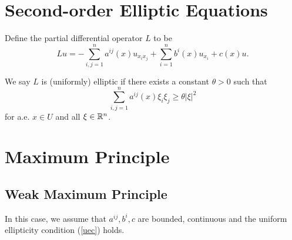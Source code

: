 \section{Second-order Elliptic Equations}
Define the partial differential operator $L$ to be
\begin{equation}
  Lu=-\sum_{i,j=1}^{n}a^{ij}(x)u_{x_ix_j}+\sum_{i=1}^{n} b^{i}(x)u_{x_i}+c(x)u.
\end{equation}
\begin{definition}
  We say $L$ is (uniformly) elliptic if there exists a constant $\theta>0$ such that
  \begin{equation}
    \sum_{i,j=1}^{n}a^{ij}(x)\xi_i\xi_j\ge \theta \left| \xi \right|^2 \label{uec}
  \end{equation}
  for a.e. $x\in U$ and all $\xi \in \mathbb{R}^{n}$.
\end{definition}
\section{Maximum Principle}
\subsection{Weak Maximum Principle}
In this case, we assume that $a^{ij},b^{i},c$ are bounded, continuous and the uniform ellipticity condition (\ref{uec}) holds. 

